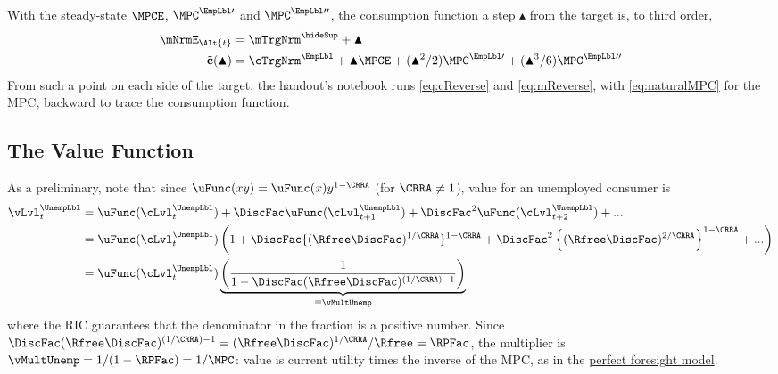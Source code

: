 \documentclass{econark}
\begin{document}
With the steady-state $\MPCE$, $\MPC^{\EmpLbl\prime}$ and $\MPC^{\EmpLbl\prime\prime}$, the consumption function a step $\blacktriangle$ from the target is, to third order,
\begin{equation}\begin{gathered}\begin{aligned}
  \mNrmE_{\Alt{t}} & = \mTrgNrm^{\hideSup} + \blacktriangle  \label{eq:revshootmstart} 
\\ \tilde{\mathbf{c}}(\blacktriangle) & = \cTrgNrm^{\EmpLbl} + \blacktriangle \MPCE+ (\blacktriangle^{2}/2) \MPC^{\EmpLbl\prime}+ (\blacktriangle^{3}/6) \MPC^{\EmpLbl\prime\prime}
\end{aligned}\end{gathered}\end{equation}
From such a point on each side of the target, the handout's notebook runs \eqref{eq:cReverse} and \eqref{eq:mReverse}, with \eqref{eq:naturalMPC} for the MPC, backward to trace the consumption function.

\subsection{The Value Function}\label{sec:TractableBufferStock-ValueFunction}

As a preliminary, note that since $\uFunc(xy)=\uFunc(x)y^{1-\CRRA}$ (for $\CRRA \neq 1$), value for an unemployed consumer is 
\begin{equation}\begin{gathered}\begin{aligned}
  \vLvl_{t}^{\UnempLbl} & =  \uFunc(\cLvl_{t}^{\UnempLbl})+\DiscFac \uFunc(\cLvl_{t+1}^{\UnempLbl}) + \DiscFac^{2} \uFunc(\cLvl_{t+2}^{\UnempLbl})+...
\\ & =  \uFunc(\cLvl_{t}^{\UnempLbl})\left(1+\DiscFac \{(\Rfree \DiscFac)^{1/\CRRA}\}^{1-\CRRA} + \DiscFac^{2}\left\{(\Rfree \DiscFac)^{2/\CRRA}\right\}^{1-\CRRA}+...\right)
\\ & =  \uFunc(\cLvl_{t}^{\UnempLbl})\underbrace{\left(\frac{1}{1-\DiscFac (\Rfree \DiscFac)^{(1/\CRRA)-1}}\right)}_{\equiv \vMultUnemp}
\end{aligned}\end{gathered}\end{equation}
where the RIC guarantees that the denominator in the fraction is a positive number.  Since $\DiscFac(\Rfree\DiscFac)^{(1/\CRRA)-1} = (\Rfree\DiscFac)^{1/\CRRA}/\Rfree = \RPFac$, the multiplier is $\vMultUnemp = 1/(1-\RPFac) = 1/\MPC$: value is current utility times the inverse of the MPC, as in the \href{https://llorracc.github.io/PerfForesightCRRA/PerfForesightCRRA-Appendix.pdf}{perfect foresight model}.  
\end{document}
